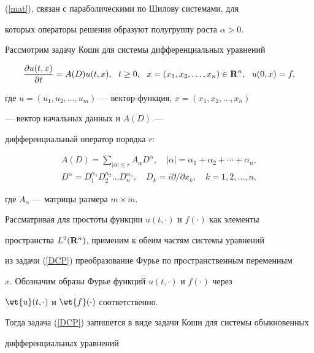 (\ref{mat}), связан с параболическими по Шилову системами, для


которых операторы решения образуют полугруппу роста $\alpha>0$.





Рассмотрим задачу Коши для системы дифференциальных уравнений


\begin{equation}\label{DCP}


\frac{\partial u(t, x)}{ \partial t}=A(D)u(t, x),\ \ t\ge 0,


\ \ x=(x_1,x_2,\dotsc, x_n)\in {\bold R}^n,\ \ u(0,x)=f,


\end{equation}


где $u=(u_1,u_2,\dotsc, u_m)$ --- вектор-функция, $x=(x_1,x_2,\dotsc, x_n)$


--- вектор начальных данных и $A(D)$ --- 


дифференциальный оператор порядка  $r$:


\begin{gather*}


A(D)=\sum_{|\alpha|\le r}A_\alpha D^\alpha,\quad


|\alpha|=\alpha_1+\alpha_2+\dotsb+\alpha_n, \\


%


D^\alpha=D^{\alpha_1}_1 D^{\alpha_2}_2\dotsc


D^{\alpha_n}_n,\quad D_k=i\partial


/\partial x_k,\quad k=1,2,\dotsc,n,


\end{gather*}


где $A_\alpha$ --- матрицы размера $m\times m$.


Рассматривая для простоты функции $u(t,\cdot)$ и $f(\cdot)$ как элементы 


пространства $L^2({\bold R}^n)$, применим к обеим частям системы уравнений


из задачи (\ref{DCP}) преобразование Фурье по пространственным переменным


$x$. Обозначим образы Фурье функций $u(t,\cdot)$ и $f(\cdot)$ через


$\wt{u}(t,\cdot)$ и $\wt{f}(\cdot)$ соответственно.


Тогда задача (\ref{DCP}) запишется в виде задачи Коши для системы обыкновенных


дифференциальных уравнений


